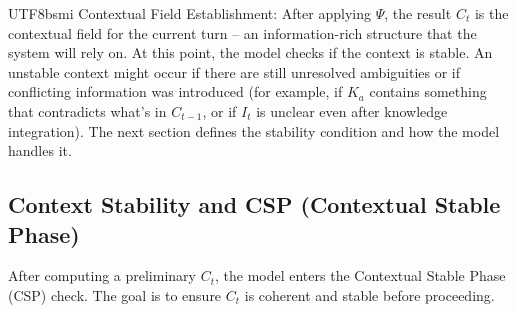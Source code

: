 \documentclass{article}
\begin{document}
\begin{CJK*}{UTF8}{bsmi}
Contextual Field Establishment: After applying $\Psi$, the result $C_t$ is the contextual field for the current turn – an information-rich structure that the system will rely on. At this point, the model checks if the context is stable. An unstable context might occur if there are still unresolved ambiguities or if conflicting information was introduced (for example, if $K_a$ contains something that contradicts what’s in $C_{t-1}$, or if $I_t$ is unclear even after knowledge integration). The next section defines the stability condition and how the model handles it.

\subsection{Context Stability and CSP (Contextual Stable Phase)}
After computing a preliminary $C_t$, the model enters the Contextual Stable Phase (CSP) check. The goal is to ensure $C_t$ is coherent and stable before proceeding.


\end{CJK*}
\end{document}

